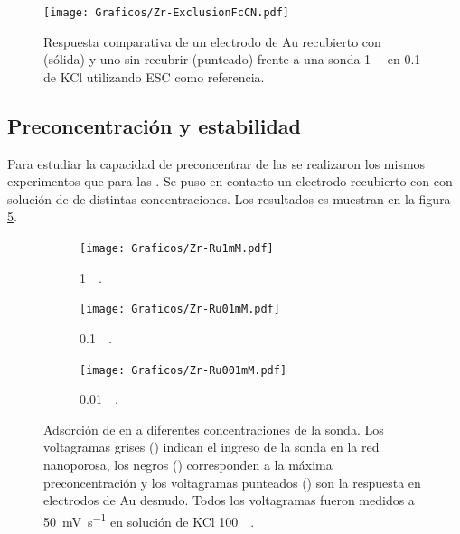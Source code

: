 				\begin{figure}[ht]
				\centering
		 	    \texttt{[image: Graficos/Zr-ExclusionFcCN.pdf]}
		        \caption[Exclusión electrostática en \pdmZ]{Respuesta comparativa de un electrodo de Au recubierto con \pdmZ\space (sólida) y uno sin recubrir (punteado) frente a una sonda \ferroferri\space \SI{1}{\milli\Molar} en \SI{0.1}{\Molar} de KCl utilizando ESC como referencia.}
		        \label{fig:fcn-zr}
		      	\end{figure} 
	
	 \subsection{Preconcentración y estabilidad}\label{sub:pcirc}

		 	Para estudiar la capacidad de preconcentrar de las \pdmZ\space se realizaron los mismos experimentos que para las \pdmF. Se puso en contacto un electrodo recubierto con \pdmZ\space con solución de \ru\space de distintas concentraciones. Los resultados es muestran en la figura \ref{fig:precon_ZR}.

	 			\begin{figure}[th]
			   	    \begin{subfigure}[t]{0.325\textwidth}
			        	\texttt{[image: Graficos/Zr-Ru1mM.pdf]}
			        	\vspace*{-0.40cm}\caption{\aminorutenio\space \SI{1}{\milli\Molar}.}
			         	\label{fig:Zr-Ru1mM}
			     		\end{subfigure}
			   	    \begin{subfigure}[t]{0.325\textwidth}
			        	\texttt{[image: Graficos/Zr-Ru01mM.pdf]}
			       		\vspace*{-0.40cm}\caption{\aminorutenio\space \SI{0.1}{\milli\Molar}.}
			         	\label{fig:Zr-Ru0.1mM}
			     		\end{subfigure}
		     		\begin{subfigure}[t]{0.325\textwidth}
			        	\texttt{[image: Graficos/Zr-Ru001mM.pdf]}
			       		\vspace*{-0.40cm}\caption{\aminorutenio\space \SI{0.01}{\milli\Molar}.}
			         	\label{fig:Zr-Ru0.01mM}
			     		\end{subfigure}
			     		\caption[Preconcentración de \aminorutenio\space en \pdmZ]{Adsorción de \ru\space en \pdmZ\space a diferentes concentraciones de la sonda. Los voltagramas grises (\usebox{\gris}) indican el ingreso de la sonda en la red nanoporosa, los negros (\usebox{\negro}) corresponden a la máxima preconcentración y los voltagramas punteados (\usebox{\punteado}) son la respuesta en electrodos de Au desnudo. Todos los voltagramas fueron medidos a \SI{50}{\milli\volt\per\second} en solución de KCl \SI{100}{\milli\Molar}.}
			     		\label{fig:precon_ZR}
		     		\end{figure}
		 
